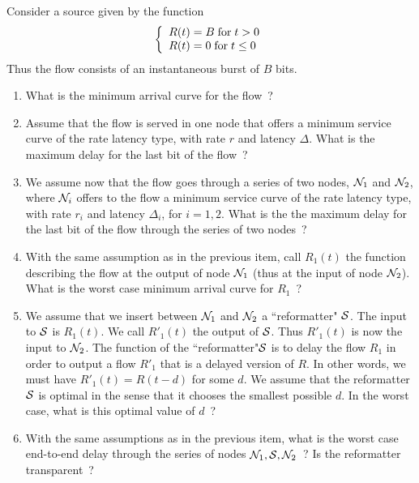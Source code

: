 \begin{problem}
 Consider a
source given by the function
$$
\left\{\begin{array}{l} R(t) = B \mathrm{\; for \; } t > 0\\R(t)= 0 \mathrm{\; for \; } t \leq 0  \end{array} \right.
$$
Thus the flow consists of an instantaneous burst of $B$ bits.
\begin{enumerate}
\item What is the minimum arrival curve for the flow~?
  \item Assume that the flow is served in one node that offers a
  minimum service curve of the rate latency type, with rate $r$
  and latency $\Delta$. What is the maximum delay for the last bit
  of the flow~?
  \item We assume now that the flow goes through a series of two
  nodes, $\mathcal N_1$ and $\mathcal N_2$, where $\mathcal N_i$ offers to the
  flow a
  minimum service curve of the rate latency type, with rate $r_i$
  and latency $\Delta_i$, for $i=1,2$. What is the the maximum delay for the last bit
  of the flow through the series of two nodes~?
  \item With the same assumption as in the previous item, call $R_1(t)$ the function describing the
  flow at the output of node $\mathcal N_1$ (thus at the input of node $\mathcal N_2$). What is
  the worst case minimum arrival curve for $R_1$~?
  \item We assume that we insert between $\mathcal N_1$ and $\mathcal N_2$ a
  ``reformatter" $\mathcal S$.
  The input to $\mathcal S$ is $R_1(t)$. We call $R'_1(t)$ the output of $\mathcal S$.
  Thus $R'_1(t)$ is now the input to $\mathcal N_2$.
   The function of the ``reformatter"$\mathcal S$ is to delay the
  flow $R_1$ in order to output a flow $R'_1$ that is a delayed version of
  $R$. In other words, we must have $R'_1(t)=R(t-d)$ for some
  $d$. We assume that the reformatter $\mathcal S$ is optimal in the
  sense that it chooses the smallest possible $d$. In the worst
  case, what is this optimal value of $d$~?
  \item With the same assumptions as in the previous item, what is
  the worst case end-to-end delay through the series of nodes
  $\mathcal N_1, \mathcal S, \mathcal N_2$~? Is the reformatter transparent~?
\end{enumerate}
\end{problem}
